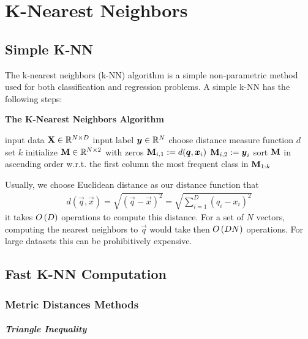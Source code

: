 
\chapter{K-Nearest Neighbors}
\label{chapter5}



\section{Simple K-NN}
\label{section5.1}

The k-nearest neighbors (k-NN) algorithm is a simple non-parametric method used for both classification and regression problems. A simple k-NN has the following steps:
\begin{algorithm}[H]
	\caption*{\bf The K-Nearest Neighbors Algorithm}
	\begin{algorithmic}
		\State input data $\mathbf{X}\in\mathbb{R}^{N\times D}$
		\State input label $\boldsymbol{y}\in\mathbb{R}^N$
		\State choose distance measure function $d$
		\State set $k$
		\State initialize $\mathbf{M}\in\mathbb{R}^{N\times2}$ with zeros
		\State $\mathbf{M}_{i,1}:=d(\boldsymbol{q},\boldsymbol{x}_i)$
		\State $\mathbf{M}_{i,2}:=\boldsymbol{y}_i$
		\EndFor
		\State sort $\mathbf{M}$ in ascending order w.r.t. the first column
		\State \Return the most frequent class in $\mathbf{M}_{1:k}$
	\end{algorithmic}
\end{algorithm}
Usually, we choose Euclidean distance as our distance function that
\begin{align*}
	d(\vec{q},\vec{x})=\sqrt{(\vec{q}-\vec{x})^2}=\sqrt{\sum_{i=1}^D(q_i-x_i)^2}
\end{align*}
it takes $O\left(D\right)$ operations to compute this distance. For a set of $N$ vectors, computing the nearest neighbors to $\vec{q}$ would take then $O\left(DN\right)$ operations. For large datasets this can be prohibitively expensive.



\section{Fast K-NN Computation}
\label{section5.2}

\subsection{Metric Distances Methods}

\paragraph{Triangle Inequality}

